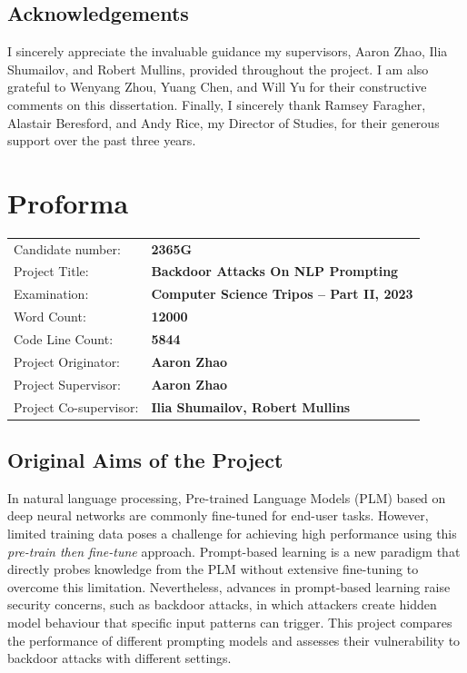 \documentclass[12pt,a4paper,twoside,openright]{report}
\begin{document}
\section*{Acknowledgements}

I sincerely appreciate the invaluable guidance my supervisors, Aaron Zhao, Ilia Shumailov, and Robert Mullins, provided throughout the project. I am also grateful to Wenyang Zhou, Yuang Chen, and Will Yu for their constructive comments on this dissertation. Finally, I sincerely thank Ramsey Faragher, Alastair Beresford, and Andy Rice, my Director of Studies, for their generous support over the past three years.

\chapter*{Proforma}
 {\large
  \begin{tabular}{ll}
	  Candidate number:   & \bf 2365G                                      \\
	  Project Title:      & \bf Backdoor Attacks On NLP Prompting        \\
	  Examination:        & \bf Computer Science Tripos -- Part II, 2023 \\
	  Word Count:         & \bf 12000\footnotemark[1]                     \\
	  Code Line Count:    & \bf 5844\footnotemark[2]                     \\
	  Project Originator: & \bf Aaron Zhao                  \\
	  Project Supervisor: & \bf Aaron Zhao                       \\
	  Project Co-supervisor: & \bf Ilia Shumailov, Robert Mullins \\
  \end{tabular}
 }

\section*{Original Aims of the Project}
In natural language processing, Pre-trained Language Models (PLM) based on deep neural networks are commonly fine-tuned for end-user tasks. However, limited training data poses a challenge for achieving high performance using this \emph{pre-train then fine-tune} approach. Prompt-based learning is a new paradigm that directly probes knowledge from the PLM without extensive fine-tuning to overcome this limitation. Nevertheless, advances in prompt-based learning raise security concerns, such as backdoor attacks, in which attackers create hidden model behaviour that specific input patterns can trigger. This project compares the performance of different prompting models and assesses their vulnerability to backdoor attacks with different settings.
\end{document}
